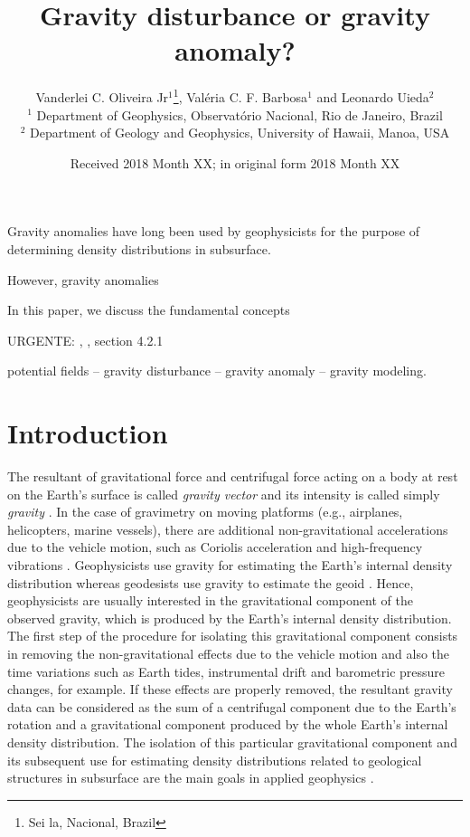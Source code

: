 \documentclass[extra]{gji}
\title[Gravity disturbance or gravity anomaly?]
      {Gravity disturbance or gravity anomaly?}
\author[Oliveira Jr, Barbosa and Uieda]
{Vanderlei C. Oliveira Jr$^1$\thanks{Sei la, Nacional, Brazil}, Val\'{e}ria C. F. Barbosa$^1$ and Leonardo Uieda$^2$ \\
	$^1$ Department of Geophysics, Observat\'{o}rio Nacional, Rio de Janeiro, Brazil \\
	$^2$ Department of Geology and Geophysics, University of Hawaii, Manoa, USA
}
\date{Received 2018 Month XX; in original form 2018 Month XX}
\begin{document}
\label{firstpage}

\maketitle


\begin{summary}
 Gravity anomalies have long been used by geophysicists for the 
 purpose of determining density distributions in subsurface.
 
 However, gravity anomalies 
 
 In this paper, we discuss the fundamental concepts 
 
 URGENTE: \citep{marussi1974}, \citep{torge2012}, section 4.2.1
\end{summary}

\begin{keywords}
 potential fields -- gravity disturbance -- gravity anomaly -- gravity modeling.
\end{keywords}

\section{Introduction}

The resultant of gravitational force and centrifugal force acting 
on a body at rest on the Earth's surface is called 
\textit{gravity vector} and its intensity is called simply 
\textit{gravity} \citep{heiskanen-moritz1967,
hofmann-wellenhof-moritz2005}.
In the case of gravimetry on moving platforms (e.g., airplanes,
helicopters, marine vessels), there are additional
non-gravitational accelerations due to the vehicle motion, 
such as Coriolis acceleration and high-frequency vibrations 
\citep{glennie-etal2000,nabighian-etal2005-grav,baumann-etal2012}.
Geophysicists use gravity for estimating the Earth's 
internal density distribution whereas geodesists use
gravity to estimate the geoid \citep{li2001}.
Hence, geophysicists are usually interested 
in the gravitational component of the observed gravity, 
which is produced by the Earth's internal 
density distribution.
%
The first step of the procedure for isolating this 
gravitational component consists in removing the non-gravitational 
effects due to the vehicle motion and also the time variations 
such as Earth tides, instrumental drift and barometric 
pressure changes, for example.
If these effects are properly removed, the resultant 
gravity data can be considered as the sum of a 
centrifugal component due to the Earth's rotation and
a gravitational component produced by the whole Earth's
internal density distribution.
The isolation of this particular gravitational component 
and its subsequent use for estimating density 
distributions related to geological structures in subsurface 
are the main goals in applied geophysics 
\citep{blakely1996}.
\end{document}
